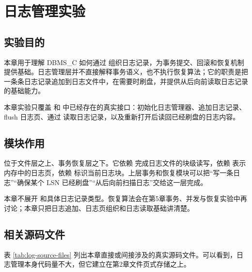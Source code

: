 \chapter{日志管理实验}
\label{chap:log}

\section{实验目的}
\label{sec:log-purpose}

本章用于理解 DBMS\_C 如何通过  组织日志记录，为事务提交、回滚和恢复机制提供基础。日志管理层并不直接解释事务语义，也不执行恢复算法；它的职责是把一条条日志记录追加到日志文件中，在需要时刷盘，并提供从后向前读取日志记录的基础能力。

本章实验只覆盖  和  中已经存在的真实接口：初始化日志管理器、追加日志记录、flush 日志页、通过  读取日志记录，以及重新打开后读回已经刷盘的日志内容。

\section{模块作用}
\label{sec:log-role}

 位于文件层之上、事务恢复层之下。它依赖  完成日志文件的块级读写，依赖  表示内存中的日志页，依赖  标识当前日志块。上层事务和恢复模块可以把“写一条日志”“确保某个 LSN 已经刷盘”“从后向前扫描日志”交给这一层完成。

本章不展开  和具体日志记录类型。恢复算法会在第5章事务、并发与恢复实验中再讨论；本章只把日志追加、日志页组织和日志读取基础讲清楚。

\section{相关源码文件}
\label{sec:log-source-files}

表 \ref{tab:log-source-files} 列出本章直接或间接涉及的真实源码文件。可以看到，日志管理本身代码量不大，但它建立在第2章文件页式存储之上。

